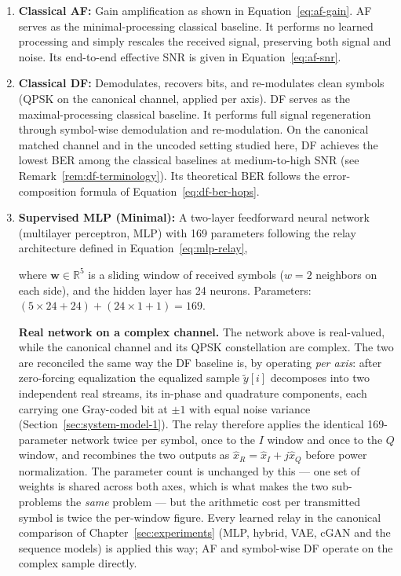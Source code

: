 \begin{enumerate}
\item \textbf{Classical AF:} Gain amplification as shown in Equation~\ref{eq:af-gain}. AF serves as the minimal-processing classical baseline. It performs no learned processing and simply rescales the received signal, preserving both signal and noise. Its end-to-end effective SNR is given in Equation~\ref{eq:af-snr}.
\item \textbf{Classical DF:} Demodulates, recovers bits, and re-modulates clean symbols (QPSK on the canonical channel, applied per axis). DF serves as the maximal-processing classical baseline. It performs full signal regeneration through symbol-wise demodulation and re-modulation. On the canonical matched channel and in the uncoded setting studied here, DF achieves the lowest BER among the classical baselines at medium-to-high SNR (see Remark~\ref{rem:df-terminology}). Its theoretical BER follows the error-composition formula of Equation~\ref{eq:df-ber-hops}.

\item \textbf{Supervised MLP (Minimal):} A two-layer feedforward neural network (multilayer perceptron, MLP) with 169 parameters following the relay architecture defined in Equation~\ref{eq:mlp-relay},

where \(\mathbf{w} \in \mathbb{R}^5\) is a sliding window of received symbols (\(w=2\) neighbors on each side), and the hidden layer has 24 neurons. Parameters: \((5 \times 24 + 24) + (24 \times 1 + 1) = 169\).

\textbf{Real network on a complex channel.} The network above is real-valued, while the canonical channel and its QPSK constellation are complex. The two are reconciled the same way the DF baseline is, by operating \emph{per axis}: after zero-forcing equalization the equalized sample $\tilde{y}[i]$ decomposes into two independent real streams, its in-phase and quadrature components, each carrying one Gray-coded bit at $\pm 1$ with equal noise variance (Section~\ref{sec:system-model-1}). The relay therefore applies the identical 169-parameter network twice per symbol, once to the $I$ window and once to the $Q$ window, and recombines the two outputs as $\hat{x}_R = \hat{x}_I + j\hat{x}_Q$ before power normalization. The parameter count is unchanged by this --- one set of weights is shared across both axes, which is what makes the two sub-problems the \emph{same} problem --- but the arithmetic cost per transmitted symbol is twice the per-window figure. Every learned relay in the canonical comparison of Chapter~\ref{sec:experiments} (MLP, hybrid, VAE, cGAN and the sequence models) is applied this way; AF and symbol-wise DF operate on the complex sample directly.


\end{enumerate}
